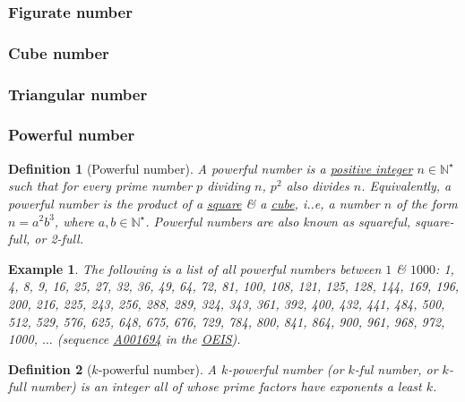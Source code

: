 \documentclass{article}
\newtheorem{definition}{Definition}
\newtheorem{example}{Example}
\begin{document}
\subsubsection{Figurate number}

\subsubsection{Cube number}

\subsubsection{Triangular number}

\subsubsection{Powerful number}

\begin{definition}[Powerful number]
	A \emph{powerful number} is a \href{https://en.wikipedia.org/wiki/Positive_integer}{positive integer} $n\in\mathbb{N}^\star$ such that for every prime number $p$ dividing $n$, $p^2$ also divides $n$. Equivalently, a powerful number is the product of a \href{https://en.wikipedia.org/wiki/Square_number}{square} \& a \href{https://en.wikipedia.org/wiki/Cube_(arithmetic)}{cube}, i..e, a number $n$ of the form $n = a^2b^3$, where $a,b\in\mathbb{N}^\star$. Powerful numbers are also known as \emph{squareful, square-full}, or \emph{2-full}.
\end{definition}

\begin{example}
	The following is a list of all powerful numbers between $1$ \& $1000$: \emph{1, 4, 8, 9, 16, 25, 27, 32, 36, 49, 64, 72, 81, 100, 108, 121, 125, 128, 144, 169, 196, 200, 216, 225, 243, 256, 288, 289, 324, 343, 361, 392, 400, 432, 441, 484, 500, 512, 529, 576, 625, 648, 675, 676, 729, 784, 800, 841, 864, 900, 961, 968, 972, 1000}, $\ldots$ (sequence \href{https://oeis.org/A001694}{A001694} in the \href{https://en.wikipedia.org/wiki/On-Line_Encyclopedia_of_Integer_Sequences}{OEIS}).
\end{example}

\begin{definition}[$k$-powerful number]
	A \emph{$k$-powerful number} (or \emph{$k$-ful number}, or \emph{$k$-full number}) is an integer all of whose prime factors have exponents a least $k$.
\end{definition}
\end{document}
